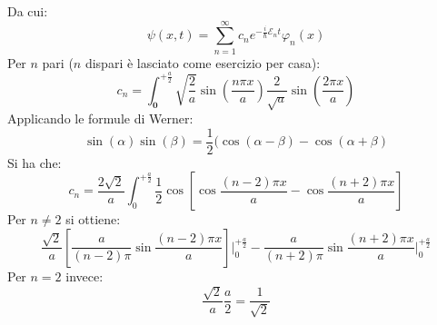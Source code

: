 \documentclass[../../FisicaTeorica.tex]{subfiles}
\begin{document}
\begin{enumerate}
\[\]
Da cui:
\[
\psi(x,t)=\sum_{n=1}^\infty c_n e^{-\frac{i}{\hbar}\mathcal{E}_n t}\varphi_n(x)
\]
Per $n$ pari ($n$ dispari è lasciato come esercizio per casa):
\[
c_n = \int_{\bm{0}}^{+\frac{a}{2}} \sqrt{\frac{2}{a}} \sin\left(\frac{n\pi x}{a}\right) \frac{2}{\sqrt{a}}\sin\left(\frac{2\pi x}{a}\right)
\]
Applicando le formule di Werner:
\[
\sin(\alpha)\sin(\beta)=\frac{1}{2}(\cos(\alpha-\beta)-\cos(\alpha+\beta)
\]
Si ha che:
\[
c_n = \frac{2\sqrt{2}}{a}\int_0^{+\frac{a}{2}} \frac{1}{2}\cos \left[\cos \frac{(n-2)\pi x}{a}-\cos\frac{(n+2)\pi x}{a}\right]
\]
Per $n\neq 2$ si ottiene:
\[
\frac{\sqrt{2}}{a}\left[\frac{a}{(n-2)\pi}\sin\frac{(n-2)\pi x}{a}\right]\Big|_0^{+\frac{a}{2}} - \frac{a}{(n+2)\pi}\sin\frac{(n+2)\pi x}{a}\Big|_0^{+\frac{a}{2}}
\]
Per $n=2$ invece:
\[
\frac{\sqrt{2}}{a}\frac{a}{2}=\frac{1}{\sqrt{2}}
\]
\end{enumerate}
\end{document}
